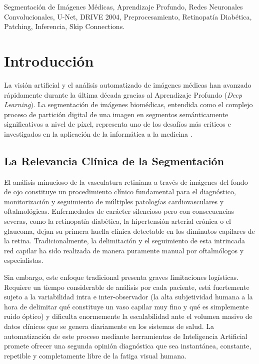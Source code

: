 \documentclass[conference]{IEEEtran}
\begin{document}
\begin{IEEEkeywords}
Segmentación de Imágenes Médicas, Aprendizaje Profundo, Redes Neuronales Convolucionales, U-Net, DRIVE 2004, Preprocesamiento, Retinopatía Diabética, Patching, Inferencia, Skip Connections.
\end{IEEEkeywords}

\section{Introducción}
La visión artificial y el análisis automatizado de imágenes médicas han avanzado rápidamente durante la última década gracias al Aprendizaje Profundo (\textit{Deep Learning}). La segmentación de imágenes biomédicas, entendida como el complejo proceso de partición digital de una imagen en segmentos semánticamente significativos a nivel de píxel, representa uno de los desafíos más críticos e investigados en la aplicación de la informática a la medicina \cite{ref1, ref3}.

\subsection{La Relevancia Clínica de la Segmentación}
El análisis minucioso de la vasculatura retiniana a través de imágenes del fondo de ojo constituye un procedimiento clínico fundamental para el diagnóstico, monitorización y seguimiento de múltiples patologías cardiovasculares y oftalmológicas. Enfermedades de carácter silencioso pero con consecuencias severas, como la retinopatía diabética, la hipertensión arterial crónica o el glaucoma, dejan su primera huella clínica detectable en los diminutos capilares de la retina. Tradicionalmente, la delimitación y el seguimiento de esta intrincada red capilar ha sido realizada de manera puramente manual por oftalmólogos y especialistas. 

Sin embargo, este enfoque tradicional presenta graves limitaciones logísticas. Requiere un tiempo considerable de análisis por cada paciente, está fuertemente sujeto a la variabilidad intra e inter-observador (la alta subjetividad humana a la hora de delimitar qué constituye un vaso capilar muy fino y qué es simplemente ruido óptico) y dificulta enormemente la escalabilidad ante el volumen masivo de datos clínicos que se genera diariamente en los sistemas de salud. La automatización de este proceso mediante herramientas de Inteligencia Artificial promete ofrecer una segunda opinión diagnóstica que sea instantánea, constante, repetible y completamente libre de la fatiga visual humana.
\end{document}
